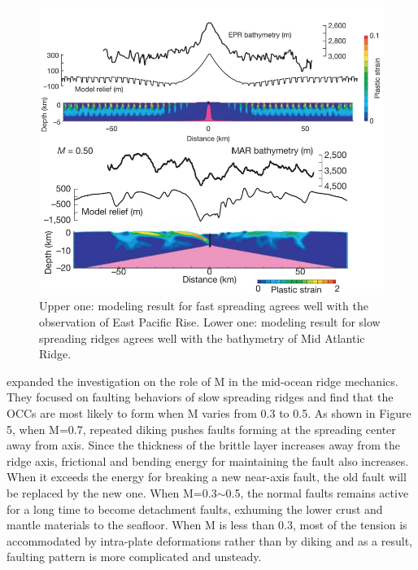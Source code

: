 \begin{figure}[H]
 \centering
  \includegraphics[scale=0.7]{./Figures/fig_Intro5_1.png}
 \caption{\small{Upper one: modeling result for fast spreading agrees well with the observation of East Pacific Rise. Lower one: modeling result for slow spreading ridges agrees well with the bathymetry of Mid Atlantic Ridge. \citep{Buck2005}}}
 \label{fig_Intro5_1}
\end{figure}
\citet{Tucholke2008} expanded the investigation on the role of M in the mid-ocean ridge mechanics. They focused on faulting behaviors of slow spreading ridges and find that the OCCs are most likely to form when M varies from 0.3 to 0.5. As shown in Figure 5, when M=0.7, repeated diking pushes faults forming at the spreading center away from axis. Since the thickness of the brittle layer increases away from the ridge axis, frictional and bending energy for maintaining the fault also increases. When it exceeds the energy for breaking a new near-axis fault, the old fault will be replaced by the new one. When M=0.3$\sim$0.5, the normal faults remains active for a long time to become detachment faults, exhuming the lower crust and mantle materials to the seafloor. When M is less than 0.3, most of the tension is accommodated by intra-plate deformations rather than by diking and as a result, faulting pattern is more complicated and unsteady.


